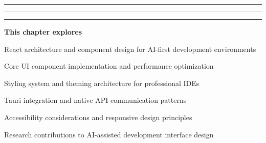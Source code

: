 \vspace{0.5cm}

\begin{center}
\textcolor{brandAccent}{
\rule{2cm}{0.8pt} \quad
\raisebox{-0.2ex}{\Large$\square$} \quad
\rule{4cm}{0.8pt} \quad
\raisebox{-0.2ex}{\Large$\square$} \quad
\rule{2cm}{0.8pt}
}
\end{center}

\vspace{2cm}

\begin{tcolorbox}[
    enhanced,
    colback=white,
    colframe=brandPrimary!40,
    boxrule=1pt,
    arc=12pt,
    drop shadow={brandPrimary!20},
    left=1.5cm,
    right=1.5cm,
    top=1.2cm,
    bottom=1.2cm,
    before upper={\parindent0pt}
]
\begin{center}
{\Large\textbf{\textcolor{brandPrimary}{This chapter explores}}}
\end{center}

\vspace{0.8cm}

\begin{compactlist}
    \item {\large React architecture and component design for AI-first development environments}
    \item {\large Core UI component implementation and performance optimization}
    \item {\large Styling system and theming architecture for professional IDEs}
    \item {\large Tauri integration and native API communication patterns}
    \item {\large Accessibility considerations and responsive design principles}
    \item {\large Research contributions to AI-assisted development interface design}
\end{compactlist}
\end{tcolorbox}

\clearpage
